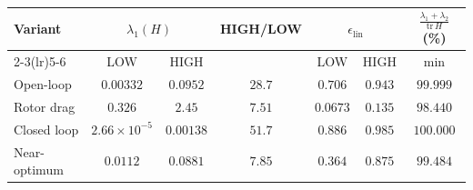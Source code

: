 \begin{tabular}{@{}lcccccc@{}}
\toprule
Variant & \multicolumn{2}{c}{$\lambda_1(H)$} & HIGH/LOW & \multicolumn{2}{c}{$\epsilon_{\mathrm{lin}}$} & $\frac{\lambda_1+\lambda_2}{\mathrm{tr}\,H}$ (\%)\\
\cmidrule(lr){2-3}\cmidrule(lr){5-6}
 & LOW & HIGH & & LOW & HIGH & min\\
\midrule
Open-loop & $0.00332$ & $0.0952$ & $28.7$ & $0.706$ & $0.943$ & $99.999$\\
Rotor drag & $0.326$ & $2.45$ & $7.51$ & $0.0673$ & $0.135$ & $98.440$\\
Closed loop & $2.66\times10^{-5}$ & $0.00138$ & $51.7$ & $0.886$ & $0.985$ & $100.000$\\
Near-optimum & $0.0112$ & $0.0881$ & $7.85$ & $0.364$ & $0.875$ & $99.484$\\
\bottomrule
\end{tabular}
